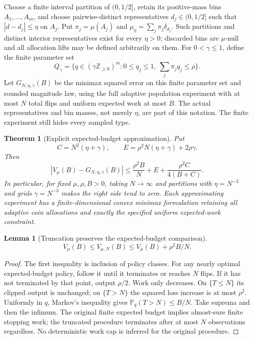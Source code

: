 \documentclass[11pt]{article}
\newtheorem{theorem}{Theorem}
\newtheorem{lemma}{Lemma}
\begin{document}
Choose a finite interval partition of $(0,1/2]$, retain its positive-mass bins
$A_1,\ldots,A_m$, and choose pairwise-distinct representatives
$d_j\in(0,1/2]$ such that
$|d-d_j|\le\eta$ on $A_j$. Put $\pi_j=\mu(A_j)$ and
$\mu_\eta=\sum_j\pi_j\delta_{d_j}$. Such partitions and distinct interior
representatives exist for every $\eta>0$; discarded bins are $\mu$-null and
all allocation lifts may be defined arbitrarily on them. For
$0<\gamma\le1$, define the finite parameter set
\[
 Q_\gamma=\{q\in(\gamma\mathbb Z_{\ge0})^m:
                    0\le q_j\le1,\ \sum_j\pi_jq_j\le\rho\}.
\]
Let $G_{N,\eta,\gamma}(B)$ be the minimax squared error on this finite
parameter set and rounded magnitude law, using the full adaptive population
experiment with at most $N$ total flips and uniform expected work at most
$B$. The actual representatives and bin masses, not merely $\eta$, are part
of this notation. The finite experiment still hides every sampled type.

\begin{theorem}[Explicit expected-budget approximation]\label{thm:approx}
Put
\[
 C=N^2(\eta+\gamma),\qquad
 E=\rho^2N(\eta+\gamma)+2\rho\gamma.
\]
Then
\[
 \left|V_\mu(B)-G_{N,\eta,\gamma}(B)\right|
 \le \frac{\rho^2B}{N}+E+
                  \frac{\rho^2 C}{4(B+C)}.                 \tag{1}
\]
In particular, for fixed $\mu,\rho,B>0$, taking $N\to\infty$ and partitions
with $\eta=N^{-3}$ and grids $\gamma=N^{-3}$ makes the right side tend to
zero. Each approximating experiment has a finite-dimensional convex
minimax formulation retaining all adaptive coin allocations and exactly
the specified uniform expected-work constraint.
\end{theorem}

\begin{lemma}[Truncation preserves the expected-budget comparison]
\[
 V_\mu(B)\le V_{\mu,N}(B)
        \le V_\mu(B)+\rho^2B/N.
\]
\end{lemma}
\begin{proof}
The first inequality is inclusion of policy classes. For any nearly optimal
expected-budget policy, follow it until it terminates or reaches $N$ flips.
If it has not terminated by that point, output $\rho/2$. Work only decreases.
On $\{T\le N\}$ its clipped output is unchanged; on $\{T>N\}$ the squared
loss increase is at most $\rho^2$. Uniformly in $q$, Markov's inequality
gives $\mathbb P_q(T>N)\le B/N$. Take suprema and then the infimum. The
original finite expected budget implies almost-sure finite stopping work;
the truncated procedure terminates after at most $N$ observations regardless.
No deterministic work cap is inferred for the original procedure.
\end{proof}
\end{document}

